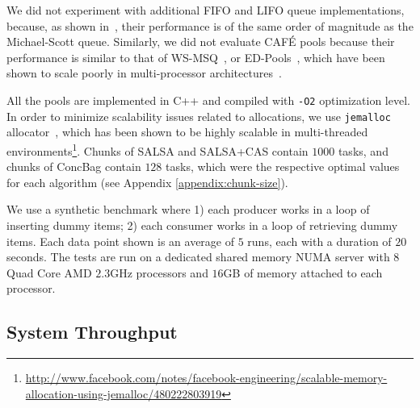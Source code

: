 We did not experiment with additional FIFO and LIFO queue implementations, because, as shown in~\cite{Sundell:2011:LAC:1989493.1989550}, their performance is of the same order of magnitude as the Michael-Scott queue. 
Similarly, we did not evaluate {CAF\'E}\cite{Basin:2011:CST:2075029.2075087} pools because their performance is similar to that of WS-MSQ~\cite{Basin:Thesis:2011}, or ED-Pools~\cite{Afek:2010:SPP:1885276.1885295}, which have been shown to scale poorly in multi-processor architectures~\cite{Basin:Thesis:2011,Sundell:2011:LAC:1989493.1989550}. 

All the pools are implemented in C++ and compiled with \texttt{-O2} optimization level. 
In order to minimize scalability issues related to allocations, we use \texttt{jemalloc} allocator~\cite{citeulike:4951109}, which has been shown to be highly scalable in multi-threaded environments\footnote{\url{http://www.facebook.com/notes/facebook-engineering/scalable-memory-allocation-using-jemalloc/480222803919}}.
Chunks of SALSA and SALSA+CAS contain $1000$ tasks, and chunks of ConcBag contain $128$ tasks, which were the respective optimal values for each algorithm (see Appendix \ref{appendix:chunk-size}). 

We use a synthetic benchmark where 1) each producer works in a loop of inserting dummy items; 2) each consumer works in a loop of retrieving dummy items. Each data point shown is an average of $5$ runs, each with a duration of $20$ seconds. 
The tests are run on a dedicated shared memory NUMA server with $8$ Quad Core AMD $2.3$GHz processors and $16$GB of memory attached to each processor. 

\subsection{System Throughput}
\label{sec:eval-performance}

